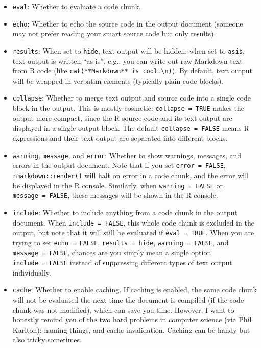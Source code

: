 \documentclass[
]{book}
\begin{document}
\begin{itemize}
\item
  \texttt{eval}: Whether to evaluate a code chunk.
\item
  \texttt{echo}: Whether to echo the source code in the output document (someone may not prefer reading your smart source code but only results).
\item
  \texttt{results}: When set to \texttt{\textquotesingle{}hide\textquotesingle{}}, text output will be hidden; when set to \texttt{\textquotesingle{}asis\textquotesingle{}}, text output is written ``as-is'', e.g., you can write out raw Markdown text from R code (like \texttt{cat(\textquotesingle{}**Markdown**\ is\ cool.\textbackslash{}n\textquotesingle{})}). By default, text output will be wrapped in verbatim elements (typically plain code blocks).
\item
  \texttt{collapse}: Whether to merge text output and source code into a single code block in the output. This is mostly cosmetic: \texttt{collapse\ =\ TRUE} makes the output more compact, since the R source code and its text output are displayed in a single output block. The default \texttt{collapse\ =\ FALSE} means R expressions and their text output are separated into different blocks.
\item
  \texttt{warning}, \texttt{message}, and \texttt{error}: Whether to show warnings, messages, and errors in the output document. Note that if you set \texttt{error\ =\ FALSE}, \texttt{rmarkdown::render()} will halt on error in a code chunk, and the error will be displayed in the R console. Similarly, when \texttt{warning\ =\ FALSE} or \texttt{message\ =\ FALSE}, these messages will be shown in the R console.
\item
  \texttt{include}: Whether to include anything from a code chunk in the output document. When \texttt{include\ =\ FALSE}, this whole code chunk is excluded in the output, but note that it will still be evaluated if \texttt{eval\ =\ TRUE}. When you are trying to set \texttt{echo\ =\ FALSE}, \texttt{results\ =\ \textquotesingle{}hide\textquotesingle{}}, \texttt{warning\ =\ FALSE}, and \texttt{message\ =\ FALSE}, chances are you simply mean a single option \texttt{include\ =\ FALSE} instead of suppressing different types of text output individually.
\item
  \texttt{cache}: Whether to enable caching. If caching is enabled, the same code chunk will not be evaluated the next time the document is compiled (if the code chunk was not modified), which can save you time. However, I want to honestly remind you of the two hard problems in computer science (via Phil Karlton): naming things, and cache invalidation. Caching can be handy but also tricky sometimes.

\end{itemize}
\end{document}
